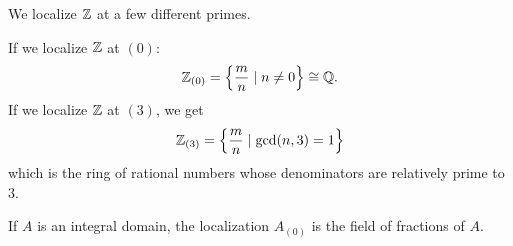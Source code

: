 \begin{example}
	We localize $\mathbb Z$ at a few different primes.
	\begin{enumerate}[(a)]
		\ii If we localize $\mathbb Z$ at $(0)$:
		\[ \mathbb Z_{(0)} = \left\{ \frac mn \mid n \ne 0 \right\}
			\cong \mathbb Q. \]
		\ii If we localize $\mathbb Z$ at $(3)$, we get
		\[ \mathbb Z_{(3)} = \left\{ \frac mn \mid \gcd(n,3) = 1 \right\} \]
		which is the ring of rational numbers
		whose denominators are relatively prime to $3$.
	\end{enumerate}
\end{example}

\begin{example}
	If $A$ is an integral domain,
	the localization $A_{(0)}$
	is the field of fractions of $A$.
\end{example}


